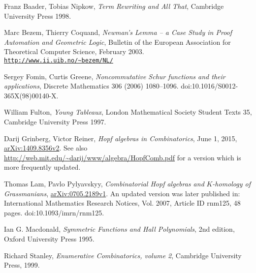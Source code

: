 \documentclass[numbers=enddot,12pt,final,onecolumn,notitlepage]{scrartcl}%
\theoremstyle{definition}
\begin{document}
\begin{thebibliography}{99999999}                                                                                         %


Franz Baader, Tobias Nipkow, \textit{Term
Rewriting and All That}, Cambridge University Press 1998.

Marc Bezem, Thierry Coquand, \textit{Newman's Lemma
-- a Case Study in Proof Automation and Geometric Logic}, Bulletin of the
European Association for Theoretical Computer Science, February 2003.\newline%
\texttt{\url{http://www.ii.uib.no/~bezem/NL/}}

Sergey Fomin, Curtis Greene, \textit{Noncommutative
Schur functions and their applications}, Discrete Mathematics 306 (2006) 1080--1096.
doi:10.1016/S0012-365X(98)00140-X.

William Fulton, \textit{Young Tableaux}, London
Mathematical Society Student Texts 35, Cambridge University Press 1997.

Darij Grinberg, Victor Reiner, \textit{Hopf
algebras in Combinatorics}, June 1, 2015,
\href{http://arxiv.org/abs/1409.8356v2}{arXiv:1409.8356v2}. \newline See also
\url{http://web.mit.edu/~darij/www/algebra/HopfComb.pdf} for a version which
is more frequently updated.

Thomas Lam, Pavlo Pylyavskyy, \textit{Combinatorial
Hopf algebras and }$K$\textit{-homology of Grassmanians},
\href{http://arxiv.org/abs/0705.2189v1}{arXiv:0705.2189v1}. An updated version
was later published in: International Mathematics Research Notices, Vol. 2007,
Article ID rnm125, 48 pages. doi:10.1093/imrn/rnm125.

Ian G. Macdonald, \textit{Symmetric Functions and
Hall Polynomials}, 2nd edition, Oxford University Press 1995.

Richard Stanley, \textit{Enumerative Combinatorics,
volume 2}, Cambridge University Press, 1999.
\end{thebibliography}
\end{document}
